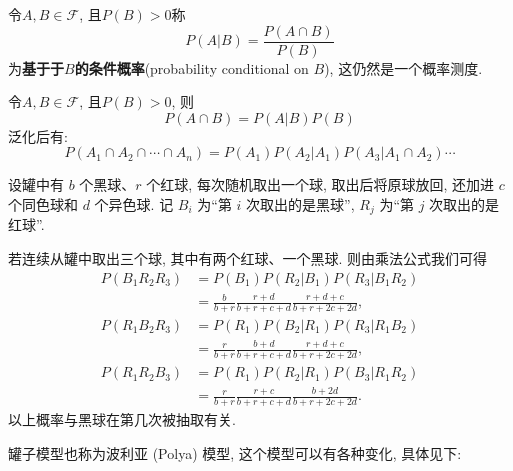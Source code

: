 \begin{definition}[条件概率]
    令$A,B \in \mathscr{F}$, 且$P(B)>0$称
    \[ P(A|B) = \frac{P(A \cap B)}{P(B)}\]
    为\textbf{基于于$B$的条件概率}(probability conditional on $B$), 这仍然是一个概率测度.
\end{definition}

\begin{theorem}[乘法法则]
    令$A,B \in \mathscr{F}$, 且$P(B)>0$, 则
    \[ P(A \cap B) = P(A|B)P(B) \]
    泛化后有:
    \[ P(A_1 \cap A_2 \cap \cdots \cap A_n) = P(A_{1})P(A_2|A_1)P(A_3|A_1\cap A_2) \cdots  \]
\end{theorem}

\begin{example}[罐子模型]\label{exam1.4.4}
    设罐中有 $b$ 个黑球、$r$ 个红球,
    每次随机取出一个球,
    取出后将原球放回,
    还加进 $c$ 个同色球和 $d$ 个异色球.
    记 $B_i$ 为“第 $i$ 次取出的是黑球”,
    $R_j$ 为“第 $j$ 次取出的是红球”.

    若连续从罐中取出三个球,
    其中有两个红球、一个黑球.
    则由乘法公式我们可得
    \begin{align*}
        P(B_1 R_2 R_3)
         & = P(B_1) P(R_2 | B_1) P(R_3 | B_1 R_2)                       \\
         & = \frac{b}{b+r} \frac{r+d}{b+r+c+d} \frac{r+d+c}{b+r+2c+2d}, \\
        P(R_1 B_2 R_3)
         & = P(R_1) P(B_2 | R_1) P(R_3 | R_1 B_2)                       \\
         & = \frac{r}{b+r} \frac{b+d}{b+r+c+d} \frac{r+d+c}{b+r+2c+2d}, \\
        P(R_1 R_2 B_3)
         & = P(R_1) P(R_2 | R_1) P(B_3 | R_1 R_2)                       \\
         & = \frac{r}{b+r} \frac{r+c}{b+r+c+d} \frac{b+2d}{b+r+2c+2d}.
    \end{align*}
    以上概率与黑球在第几次被抽取有关.
\end{example}

罐子模型也称为波利亚 (Polya) 模型,
这个模型可以有各种变化,
具体见下:

